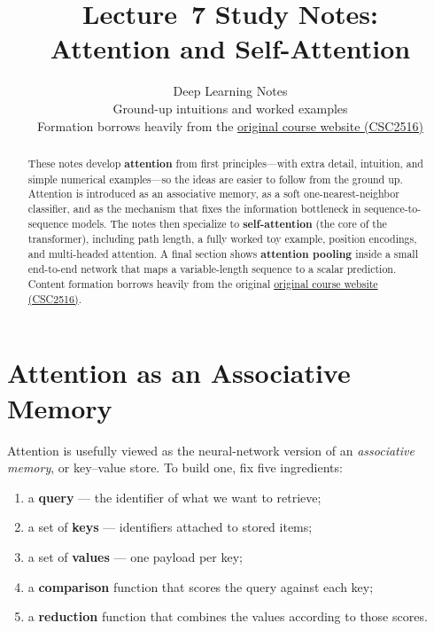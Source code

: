 \documentclass[11pt]{article}
\title{Lecture~7 Study Notes:\\Attention and Self-Attention}
\author{Deep Learning Notes\\
\small Ground-up intuitions and worked examples\\[0.35em]
\small Formation borrows heavily from the
\href{https://r-three.github.io/deep-learning-lecture-notes/}{original course website (CSC2516)}}
\date{}
\begin{document}
\maketitle

\begin{abstract}
These notes develop \textbf{attention} from first principles---with extra
detail, intuition, and simple numerical examples---so the ideas are easier
to follow from the ground up. Attention is introduced as an associative
memory, as a soft one-nearest-neighbor classifier, and as the mechanism that
fixes the information bottleneck in sequence-to-sequence models. The notes
then specialize to \textbf{self-attention} (the core of the transformer),
including path length, a fully worked toy example, position encodings, and
multi-headed attention. A final section shows \textbf{attention pooling}
inside a small end-to-end network that maps a variable-length sequence to a
scalar prediction. Content formation borrows heavily from the original
\href{https://r-three.github.io/deep-learning-lecture-notes/}{original course
website (CSC2516)}.
\end{abstract}

\tableofcontents
\vspace{1em}

\section{Attention as an Associative Memory}

Attention is usefully viewed as the neural-network version of an
\emph{associative memory}, or key--value store. To build one, fix five
ingredients:

\begin{enumerate}[leftmargin=*]
  \item a \textbf{query} --- the identifier of what we want to retrieve;
  \item a set of \textbf{keys} --- identifiers attached to stored items;
  \item a set of \textbf{values} --- one payload per key;
  \item a \textbf{comparison} function that scores the query against each key;
  \item a \textbf{reduction} function that combines the values according to
        those scores.
\end{enumerate}
\end{document}
